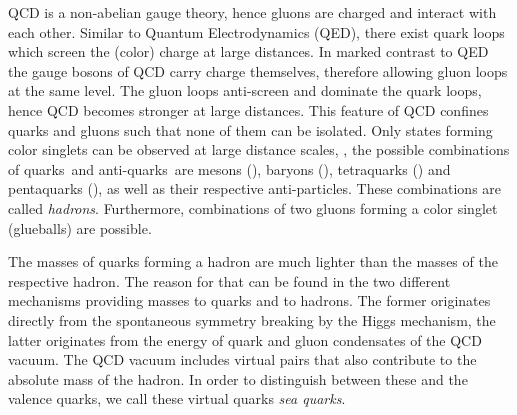 QCD is a non-abelian gauge theory, hence gluons are charged and interact with each other.
Similar to Quantum Electrodynamics (QED), there exist quark loops which screen the (color) charge at large distances.
In marked contrast to QED the gauge bosons of QCD carry charge themselves, therefore allowing gluon loops at the same level.
The gluon loops anti-screen and dominate the quark loops, hence QCD becomes stronger at large distances.
This feature of QCD confines quarks and gluons such that none of them can be isolated.
Only states forming color singlets can be observed at large distance scales, \ie{}, the possible combinations of quarks~\quark and anti-quarks~\quarkbar are mesons (\qqbar), baryons (\quark\quark\quark), tetraquarks (\quark\quark\quarkbar\quarkbar) and pentaquarks (\quark\quark\quark\quark\quarkbar), as well as their respective anti-particles.
These combinations are called \textit{hadrons}.
Furthermore, combinations of two gluons forming a color singlet (glueballs) are possible.

The masses of quarks forming a hadron are much lighter than the masses of the respective hadron.
The reason for that can be found in the two different mechanisms providing masses to quarks and to hadrons.
The former originates directly from the spontaneous symmetry breaking by the Higgs mechanism, the latter originates from the energy of quark and gluon condensates of the QCD vacuum.
The QCD vacuum includes virtual \qqbar pairs that also contribute to the absolute mass of the hadron.
In order to distinguish between these and the valence quarks, we call these virtual quarks \textit{sea quarks}.

